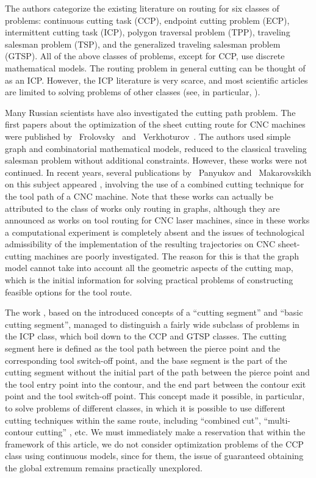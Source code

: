 \documentclass[numbers,sort&compress]{IntechOpen-Book}%
\begin{document}
The authors categorize the existing literature on routing
for six classes of problems:
continuous cutting task (CCP),
endpoint cutting problem (ECP),
intermittent cutting task (ICP),
polygon traversal problem (TPP),
traveling salesman problem (TSP),
and the generalized traveling salesman problem (GTSP).
All of the above classes of problems, except for CCP, use discrete mathematical models.
The routing problem in general cutting can be thought of as an ICP.
However, the ICP literature is very scarce,
and most scientific articles are limited to solving problems of other classes (see, in particular, \cite{bibx:301}).

Many Russian scientists have also investigated the cutting path problem. The first papers about the optimization of the sheet cutting route for CNC machines
were published by ~Frolovsky~\cite{bibx:104}
and ~Verkhoturov~\cite{bibx:105}.
The authors used simple graph and combinatorial mathematical models,
reduced to the classical traveling salesman problem without additional constraints.
However, these works were not continued.
In recent years, several publications by ~Panyukov
and ~Makarovskikh on this subject appeared
\cite{bibx:106,bibx:107,bibx:108},
involving the use of a combined cutting technique
for the tool path of a CNC machine.
Note that these works can actually be attributed to the class of works only routing in graphs, although they are announced as works on tool routing for CNC laser machines, since in these works a computational experiment is completely absent
and the issues of technological admissibility of the implementation of the resulting trajectories on CNC sheet-cutting machines are poorly investigated.
The reason for this is that the graph model
cannot take into account all the geometric aspects of the cutting map, which is the initial information for solving practical problems of constructing feasible options for the tool route.


The work \cite{bibx:308,bibx:112},
based on the introduced concepts of a ``cutting segment''
and ``basic cutting segment'',
managed to distinguish a fairly wide subclass of problems in the ICP class,
which boil down to the CCP and GTSP classes.
The cutting segment here is defined as the tool path between the pierce point and the corresponding tool switch-off point, and the base segment is the part of the cutting segment without the initial part of the path between the pierce point and the tool entry point into the contour, and the end part between the contour exit point and the tool switch-off point.
This concept made it possible, in particular,
to solve problems of different classes,
in which it is possible to use different cutting techniques within the same route,
including ``combined cut'', ``multi-contour cutting''
\cite[part I] {4}, etc.
We must immediately make a reservation that within the framework of this article, we do not consider optimization problems of the CCP class using continuous models,
since for them, the issue of guaranteed obtaining the global extremum remains practically unexplored.
\end{document}
